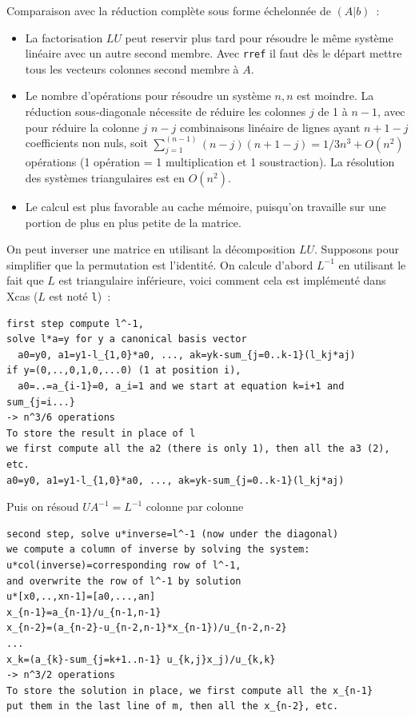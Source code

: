 \documentclass[a4paper,11pt]{book}
\begin{document}
\begin{giacjshere}
Comparaison avec la r\'eduction compl\`ete sous forme \'echelonn\'ee de
$(A|b)$~:
\begin{itemize}
\item La factorisation $LU$ peut reservir plus tard pour r\'esoudre le m\^eme
syst\`eme lin\'eaire avec un autre second membre.
Avec \verb|rref| il faut d\`es le d\'epart mettre tous les
vecteurs colonnes second membre \`a $A$.
\item Le nombre d'op\'erations pour r\'esoudre un syst\`eme $n,n$
est moindre. La r\'eduction sous-diagonale n\'ecessite de r\'eduire
les colonnes $j$ de 1 \`a $n-1$, avec pour r\'eduire la colonne $j$
$n-j$ combinaisons lin\'eaire de lignes ayant $n+1-j$ coefficients non
nuls, soit $\sum_{j=1}^(n-1) (n-j)(n+1-j)=1/3n^3+O(n^2)$ op\'erations
(1 op\'eration = 1 multiplication et 1 soustraction).
La r\'esolution des syst\`emes triangulaires est en $O(n^2)$.
\item Le calcul est plus favorable au cache m\'emoire, puisqu'on
  travaille sur une portion de plus en plus petite de la matrice.
\end{itemize}

On peut inverser une matrice en utilisant la d\'ecomposition
$LU$. Supposons pour simplifier que la permutation est l'identit\'e.
On calcule d'abord $L^{-1}$ en utilisant le fait que $L$ est
triangulaire inf\'erieure, voici comment cela est impl\'ement\'e dans
Xcas ($L$ est not\'e {\tt l})~:
\begin{verbatim}
first step compute l^-1, 
solve l*a=y for y a canonical basis vector
  a0=y0, a1=y1-l_{1,0}*a0, ..., ak=yk-sum_{j=0..k-1}(l_kj*aj)
if y=(0,..,0,1,0,...0) (1 at position i), 
  a0=..=a_{i-1}=0, a_i=1 and we start at equation k=i+1 and sum_{j=i...}
-> n^3/6 operations
To store the result in place of l
we first compute all the a2 (there is only 1), then all the a3 (2), etc.
a0=y0, a1=y1-l_{1,0}*a0, ..., ak=yk-sum_{j=0..k-1}(l_kj*aj)
\end{verbatim}
Puis on r\'esoud $U A^{-1}=L^{-1}$ colonne par colonne
\begin{verbatim}
second step, solve u*inverse=l^-1 (now under the diagonal)
we compute a column of inverse by solving the system: 
u*col(inverse)=corresponding row of l^-1, 
and overwrite the row of l^-1 by solution
u*[x0,..,xn-1]=[a0,...,an]
x_{n-1}=a_{n-1}/u_{n-1,n-1}
x_{n-2}=(a_{n-2}-u_{n-2,n-1}*x_{n-1})/u_{n-2,n-2}
...
x_k=(a_{k}-sum_{j=k+1..n-1} u_{k,j}x_j)/u_{k,k}
-> n^3/2 operations
To store the solution in place, we first compute all the x_{n-1}
put them in the last line of m, then all the x_{n-2}, etc.
\end{verbatim}


\end{giacjshere}
\end{document}
